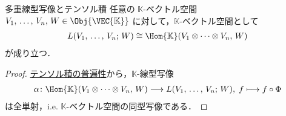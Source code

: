 \documentclass[geometry_main]{subfiles}
\begin{document}
\begin{myprop}[label=prop:tensor-multillinear]{多重線型写像とテンソル積}
    任意の $\mathbb{K}$-ベクトル空間 $V_1,\, \dots,\, V_n,\, W \in \Obj{\VEC{\mathbb{K}}}$ に対して，$\mathbb{K}$-ベクトル空間として
    \begin{align}
        L(V_1,\, \dots,\, V_n;\, W) \cong \Hom{\mathbb{K}}(V_1 \otimes \cdots \otimes V_n,\, W)
    \end{align}
    が成り立つ．
\end{myprop}

\begin{proof}
    \hyperref[def:univ-vec-tensor]{テンソル積の普遍性}から，$\mathbb{K}$-線型写像
    \begin{align}
        \alpha \colon \Hom{\mathbb{K}}(V_1 \otimes \cdots \otimes V_n,\, W) \lto L(V_1,\, \dots,\, V_n;\, W),\; f \lmto f \circ \Phi
    \end{align}
    は全単射，i.e. $\mathbb{K}$-ベクトル空間の同型写像である．
\end{proof}


\end{document}
